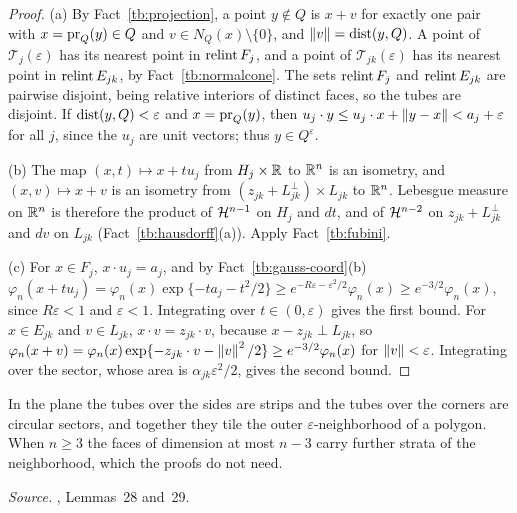 \begin{proof}
(a) By Fact~\ref{tb:projection}, a point \(y\notin Q\) is \(x+v\) for exactly
one pair with \(x=\operatorname{pr}_Q(y)\in Q\) and \(v\in N_Q(x)\setminus\{0\}\), and
\(\left\lVert v\right\rVert=\operatorname{dist}(y,Q)\). A point of \(\mathcal T_j(\varepsilon)\) has its nearest
point in \(\operatorname{relint} F_j\), and a point of \(\mathcal T_{jk}(\varepsilon)\) has
its nearest point in \(\operatorname{relint} E_{jk}\), by Fact~\ref{tb:normalcone}. The
sets \(\operatorname{relint} F_j\) and \(\operatorname{relint} E_{jk}\) are pairwise disjoint, being
relative interiors of distinct faces, so the tubes are disjoint. If
\(\operatorname{dist}(y,Q)<\varepsilon\) and \(x=\operatorname{pr}_Q(y)\), then
\(u_j\cdot y\le u_j\cdot x+\left\lVert y-x\right\rVert<a_j+\varepsilon\) for all \(j\), since the
\(u_j\) are unit vectors; thus \(y\in Q^\varepsilon\).

(b) The map \((x,t)\mapsto x+tu_j\) from \(H_j\times\mathbb R\) to \(\mathbb R^n\) is an
isometry, and \((x,v)\mapsto x+v\) is an isometry from
\((z_{jk}+L_{jk}^\perp)\times L_{jk}\) to \(\mathbb R^n\). Lebesgue measure on
\(\mathbb R^n\) is therefore the product of \(\mathcal H^{n-1}\) on \(H_j\) and \(dt\), and
of \(\mathcal H^{n-2}\) on \(z_{jk}+L_{jk}^\perp\) and \(dv\) on \(L_{jk}\)
(Fact~\ref{tb:hausdorff}(a)). Apply Fact~\ref{tb:fubini}.

(c) For \(x\in F_j\), \(x\cdot u_j=a_j\), and by Fact~\ref{tb:gauss-coord}(b)
\(\varphi_n(x+tu_j)=\varphi_n(x)\exp\{-ta_j-t^2/2\}\ge e^{-R\varepsilon-
\varepsilon^2/2}\varphi_n(x)\ge e^{-3/2}\varphi_n(x)\), since
\(R\varepsilon<1\) and \(\varepsilon<1\). Integrating over
\(t\in(0,\varepsilon)\) gives the first bound. For \(x\in E_{jk}\) and
\(v\in L_{jk}\), \(x\cdot v=z_{jk}\cdot v\), because \(x-z_{jk}\perp L_{jk}\),
so \(\varphi_n(x+v)=\varphi_n(x)\exp\{-z_{jk}\cdot v-\left\lVert v\right\rVert^2/2\}
\ge e^{-3/2}\varphi_n(x)\) for \(\left\lVert v\right\rVert<\varepsilon\). Integrating over the
sector, whose area is \(\alpha_{jk}\varepsilon^2/2\), gives the second bound.
\end{proof}

In the plane the tubes over the sides are strips and the tubes over the
corners are circular sectors, and together they tile the outer
\(\varepsilon\)-neighborhood of a polygon. When \(n\ge3\) the faces of
dimension at most \(n-3\) carry further strata of the neighborhood, which the
proofs do not need.

\emph{Source.} , Lemmas~28 and~29.

